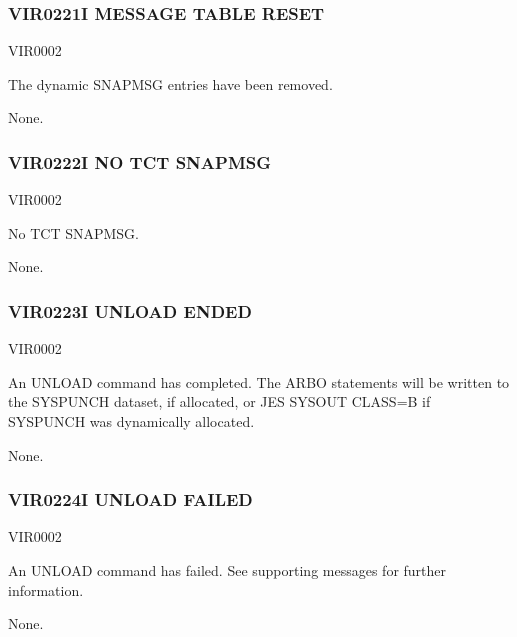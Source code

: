 \documentclass[letterpaper,10pt,english]{sphinxmanual}
\begin{document}
\subsubsection{VIR0221I MESSAGE TABLE RESET}
\label{\detokenize{messages:vir0221i-message-table-reset}}\begin{description}
\sphinxAtStartPar
VIR0002

\sphinxAtStartPar
The dynamic SNAPMSG entries have been removed.

\sphinxAtStartPar
None.

\end{description}


\subsubsection{VIR0222I NO TCT SNAPMSG}
\label{\detokenize{messages:vir0222i-no-tct-snapmsg}}\begin{description}
\sphinxAtStartPar
VIR0002

\sphinxAtStartPar
No TCT SNAPMSG.

\sphinxAtStartPar
None.

\end{description}


\subsubsection{VIR0223I UNLOAD ENDED}
\label{\detokenize{messages:vir0223i-unload-ended}}\begin{description}
\sphinxAtStartPar
VIR0002

\sphinxAtStartPar
An UNLOAD command has completed. The ARBO statements will be written to the SYSPUNCH dataset, if allocated, or JES SYSOUT CLASS=B if SYSPUNCH was dynamically allocated.

\sphinxAtStartPar
None.

\end{description}


\subsubsection{VIR0224I UNLOAD FAILED}
\label{\detokenize{messages:vir0224i-unload-failed}}\begin{description}
\sphinxAtStartPar
VIR0002

\sphinxAtStartPar
An UNLOAD command has failed. See supporting messages for further information.

\sphinxAtStartPar
None.

\end{description}
\end{document}
